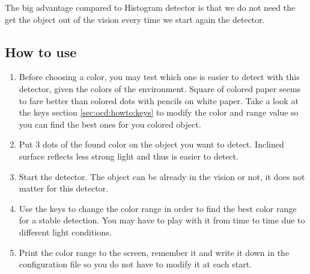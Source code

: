 The big advantage compared to Histogram detector is that we do not need 
the get the object out of the vision every time we start again the 
detector. 


\subsection{How to use}
\label{sec:ocd:howto}
    \begin{enumerate}
        \item Before choosing a color, you may test which one is easier 
        to detect with this detector, given the colors of the environment. 
        Square of colored paper seems to fare better than colored 
        dots with pencils on white paper. Take a look at the keys section
        \ref{sec:ocd:howto:keys} to modify the color and range value so
        you can find the best ones for you colored object.
        \item Put 3 dots of the found color on the object you want to 
        detect. Inclined surface reflects less strong light 
            and thus is easier to detect.
        \item Start the detector. The object can be already in the vision 
        or not, it does not matter for this detector. 
        \item Use the keys to change the color range in order to find the 
        best color range for a stable detection. You may have to play
        with it from time to time due to different light conditions. 
        \item Print the color range to the screen, remember it and write 
        it down in the configuration file so you do not have to modify it 
        at each start.
    \end{enumerate}

